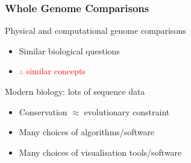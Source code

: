 %
\begin{frame}
  \frametitle{Whole Genome Comparisons}
  \textcolor{RawSienna}{Physical and computational genome comparisons} \\
  \begin{itemize}
    \item Similar biological questions
    \item \textcolor{red}{$\therefore$ similar concepts}
  \end{itemize}  
  \textcolor{hutton_green}{Modern biology: lots of sequence data}
  \begin{itemize}
    \item Conservation $\approx$ evolutionary constraint
    \item \textcolor{hutton_blue}{Many choices of algorithms/software}
    \item \textcolor{hutton_purple}{Many choices of visualisation tools/software}
  \end{itemize}  
\end{frame}
